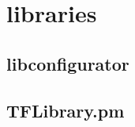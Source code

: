 \documentclass[11pt,a4paper,openany,oneside]{book}
\begin{document}










\section{libraries}

\subsection{libconfigurator}

\subsection{TFLibrary.pm}




\end{document}
